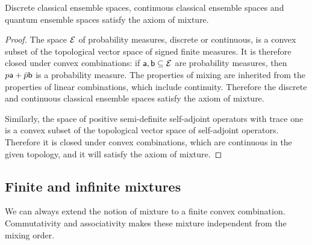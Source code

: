 \begin{mathSection}
\begin{prop}
	Discrete classical ensemble spaces, continuous classical ensemble spaces and quantum ensemble spaces satisfy the axiom of mixture.
\end{prop}

\begin{proof}
	The space $\Ens$ of probability measures, discrete or continuous, is a convex subset of the topological vector space of signed finite measures. It is therefore closed under convex combinations: if $\ens[a], \ens[b] \subseteq \Ens$ are probability measures, then $p \ens[a] + \bar{p} \ens[b]$ is a probability measure. The properties of mixing are inherited from the properties of linear combinations, which include continuity. Therefore the discrete and continuous classical ensemble spaces satisfy the axiom of mixture.
	
	Similarly, the space of positive semi-definite self-adjoint operators with trace one is a convex subset of the topological vector space of self-adjoint operators. Therefore it is closed under convex combinations, which are continuous in the given topology, and it will satisfy the axiom of mixture.
\end{proof}
\end{mathSection}

\subsection{Finite and infinite mixtures}

We can always extend the notion of mixture to a finite convex combination. Commutativity and associativity makes these mixture independent from the mixing order.

